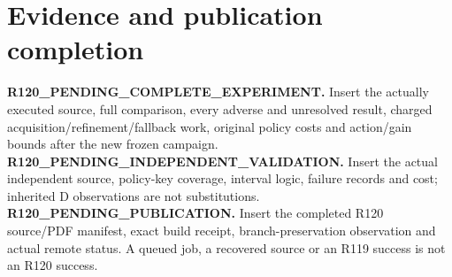 \section{Evidence and publication completion}
\textbf{R120\_PENDING\_COMPLETE\_EXPERIMENT.}
Insert the actually executed source, full comparison, every adverse and
unresolved result, charged acquisition/refinement/fallback work, original
policy costs and action/gain bounds after the new frozen campaign.
\textbf{R120\_PENDING\_INDEPENDENT\_VALIDATION.}
Insert the actual independent source, policy-key coverage, interval logic,
failure records and cost; inherited D observations are not substitutions.
\textbf{R120\_PENDING\_PUBLICATION.}
Insert the completed R120 source/PDF manifest, exact build receipt,
branch-preservation observation and actual remote status. A queued job,
a recovered source or an R119 success is not an R120 success.
